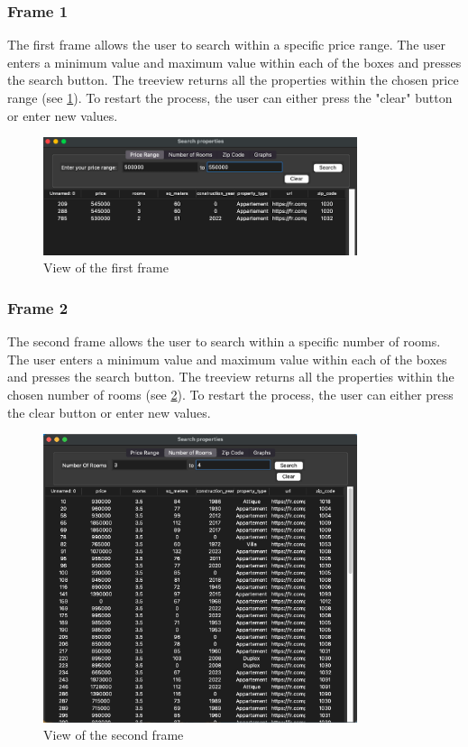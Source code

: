 \documentclass[main]{subfiles}
\begin{document}
\subsubsection{Frame 1}
The first frame allows the user to search within a specific price range. 
The user enters a minimum value and maximum value within each of the boxes and presses the search button. 
The treeview returns all the properties within the chosen price range (see \ref{fig:frame1}).
To restart the process, the user can either press the "clear" button or enter new values.

\begin{figure}[htbp]
    \centerline{
        \includegraphics[width = 92mm]{prog_8.png}}
    \caption{View of the first frame}
    \label{fig:frame1}
\end{figure}

\subsubsection{Frame 2}
The second frame allows the user to search within a specific number of rooms. 
The user enters a minimum value and maximum value within each of the boxes and presses the search button. 
The treeview returns all the properties within the chosen number of rooms (see \ref{fig:frame2}).
To restart the process, the user can either press the clear button or enter new values.

\begin{figure}[htbp]
    \centerline{
        \includegraphics[width = 92mm]{prog_9.png}}
    \caption{View of the second frame}
    \label{fig:frame2}
\end{figure}
\end{document}
